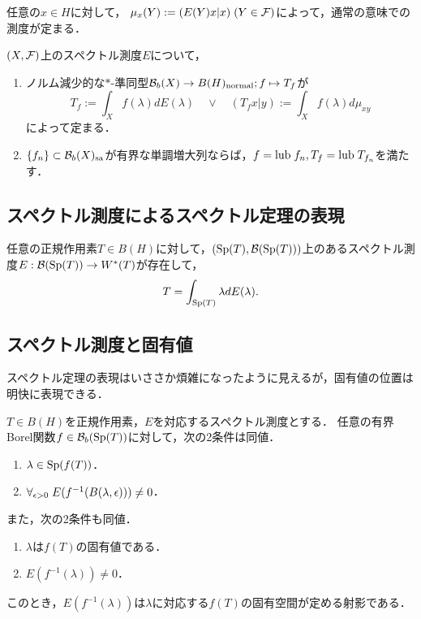 \documentclass[uplatex,dvipdfmx]{jsreport}
\begin{document}
\begin{notation}
    任意の$x\in H$に対して，
    $\mu_x(Y):=(E(Y)x|x)\;(Y\in\mathcal{F})$によって，通常の意味での測度が定まる．
\end{notation}

\begin{proposition}
    $(X,\mathcal{F})$上のスペクトル測度$E$について，
    \begin{enumerate}
        \item ノルム減少的な$*$-準同型$\mathcal{B}_b(X)\to B(H)_{\mathrm{normal}};f\mapsto T_f$が
        \[T_f:=\int_Xf(\lambda)dE(\lambda)\quad\lor\quad (T_fx|y):=\int_Xf(\lambda )d\mu_{xy}\]
        によって定まる．
        \item $\{f_n\}\subset\mathcal{B}_b(X)_{\mathrm{sa}}$が有界な単調増大列ならば，$f=\mathrm{lub}\; f_n,T_f=\mathrm{lub}\; T_{f_n}$を満たす．
    \end{enumerate}
\end{proposition}

\subsection{スペクトル測度によるスペクトル定理の表現}

\begin{proposition}
    任意の正規作用素$T\in B(H)$に対して，$(\mathrm{Sp}(T),\mathcal{B}(\mathrm{Sp}(T)))$上のあるスペクトル測度$E:\mathcal{B}(\mathrm{Sp}(T))\to W^*(T)$が存在して，
    \[T=\int_{\mathrm{Sp}(T)}\lambda dE(\lambda).\]
\end{proposition}

\subsection{スペクトル測度と固有値}

\begin{tcolorbox}[colframe=ForestGreen, colback=ForestGreen!10!white,breakable,colbacktitle=ForestGreen!40!white,coltitle=black,fonttitle=\bfseries\sffamily,
title=]
    スペクトル定理の表現はいささか煩雑になったように見えるが，固有値の位置は明快に表現できる．
\end{tcolorbox}

\begin{proposition}
    $T\in B(H)$を正規作用素，$E$を対応するスペクトル測度とする．
    任意の有界Borel関数$f\in\mathcal{B}_b(\mathrm{Sp}(T))$に対して，次の2条件は同値．
    \begin{enumerate}
        \item $\lambda\in\mathrm{Sp}(f(T))$．
        \item $\forall_{\epsilon>0}\;E(f^{-1}(B(\lambda,\epsilon)))\ne0$．
    \end{enumerate}
    また，次の2条件も同値．
    \begin{enumerate}
        \item $\lambda$は$f(T)$の固有値である．
        \item $E(f^{-1}(\lambda))\ne0$．
    \end{enumerate}
    このとき，$E(f^{-1}(\lambda))$は$\lambda$に対応する$f(T)$の固有空間が定める射影である．
\end{proposition}
\end{document}
